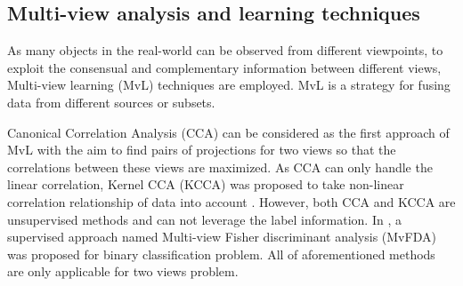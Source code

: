 
    \subsection{Multi-view analysis and learning techniques}
        As many objects in the real-world can be observed from different viewpoints, to exploit the consensual and complementary information between different views, Multi-view learning (MvL) techniques are employed.
        MvL is a strategy for fusing data from different sources or subsets.

        Canonical Correlation Analysis (CCA) \cite{Hotelling} can be considered as the first approach of MvL with the aim to find pairs of projections for two views so that the correlations between these views are maximized.
        As CCA can only handle the linear correlation, Kernel CCA (KCCA) was proposed to take non-linear correlation relationship of data into account \cite{Akaho2006}.
        However, both CCA and KCCA are unsupervised methods and can not leverage the label information.
        In \cite{diethe2008multi-view}, a supervised approach named Multi-view Fisher discriminant analysis (MvFDA) was proposed for binary classification problem.
        All of aforementioned methods are only applicable for two views problem.

